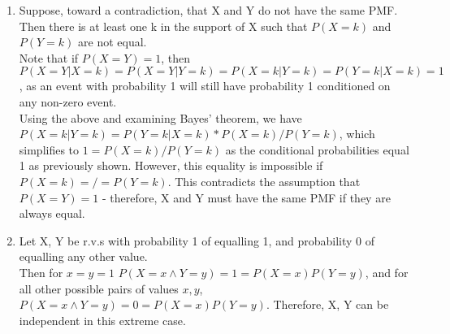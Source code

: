 \begin{enumerate}[label=(\alph*)]
\item Suppose, toward a contradiction, that X and Y do not have the same PMF. Then there is at least one k in the support of X such that $P(X=k)$ and $P(Y=k)$ are not equal. 
\\
Note that if $P(X=Y)=1$, then $P(X=Y|X=k) = P(X=Y|Y=k) = P(X=k|Y=k) = P(Y=k | X=k) = 1$, as an event with probability 1 will still have probability 1 conditioned on any non-zero event.
\\
Using the above and examining Bayes' theorem, we have $P(X=k|Y=k) = P(Y=k|X=k)*P(X=k)/P(Y=k)$, which simplifies to $1 = P(X=k)/P(Y=k)$ as the conditional probabilities equal 1 as previously shown. However, this equality is impossible if $P(X=k) =/= P(Y=k)$. This contradicts the assumption that $P(X=Y)=1$ - therefore, X and Y must have the same PMF if they are always equal. 
\\
\item Let X, Y be r.v.s with probability 1 of equalling 1, and probability 0 of equalling any other value.
\\
Then for $x=y=1$ $P(X = x \wedge Y = y) = 1 = P(X=x)P(Y=y)$, and for all other possible pairs of values $x,y$, $P(X=x \wedge Y = y) = 0 = P(X=x)P(Y=y)$. Therefore, X, Y can be independent in this extreme case.
\end{enumerate}
